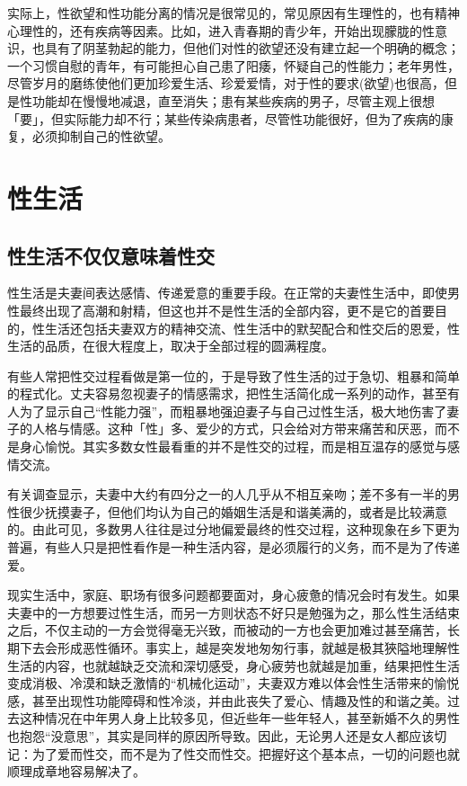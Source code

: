 \documentclass[12pt,UTF8]{ctexbook}
\begin{document}
实际上，性欲望和性功能分离的情况是很常见的，常见原因有生理性的，也有精神心理性的，还有疾病等因素。比如，进入青春期的青少年，开始出现朦胧的性意识，也具有了阴茎勃起的能力，但他们对性的欲望还没有建立起一个明确的概念；一个习惯自慰的青年，有可能担心自己患了阳痿，怀疑自己的性能力；老年男性，尽管岁月的磨练使他们更加珍爱生活、珍爱爱情，对于性的要求(欲望)也很高，但是性功能却在慢慢地减退，直至消失；患有某些疾病的男子，尽管主观上很想「要」，但实际能力却不行；某些传染病患者，尽管性功能很好，但为了疾病的康复，必须抑制自己的性欲望。

\part{性生活}

\chapter{性生活不仅仅意味着性交}

性生活是夫妻间表达感情、传递爱意的重要手段。在正常的夫妻性生活中，即使男性最终出现了高潮和射精，但这也并不是性生活的全部内容，更不是它的首要目的，性生活还包括夫妻双方的精神交流、性生活中的默契配合和性交后的恩爱，性生活的品质，在很大程度上，取决于全部过程的圆满程度。

有些人常把性交过程看做是第一位的，于是导致了性生活的过于急切、粗暴和简单的程式化。丈夫容易忽视妻子的情感需求，把性生活简化成一系列的动作，甚至有人为了显示自己“性能力强”，而粗暴地强迫妻子与自己过性生活，极大地伤害了妻子的人格与情感。这种「性」多、爱少的方式，只会给对方带来痛苦和厌恶，而不是身心愉悦。其实多数女性最看重的并不是性交的过程，而是相互温存的感觉与感情交流。

有关调查显示，夫妻中大约有四分之一的人几乎从不相互亲吻；差不多有一半的男性很少抚摸妻子，但他们均认为自己的婚姻生活是和谐美满的，或者是比较满意的。由此可见，多数男人往往是过分地偏爱最终的性交过程，这种现象在乡下更为普遍，有些人只是把性看作是一种生活内容，是必须履行的义务，而不是为了传递爱。

现实生活中，家庭、职场有很多问题都要面对，身心疲惫的情况会时有发生。如果夫妻中的一方想要过性生活，而另一方则状态不好只是勉强为之，那么性生活结束之后，不仅主动的一方会觉得毫无兴致，而被动的一方也会更加难过甚至痛苦，长期下去会形成恶性循环。事实上，越是突发地匆匆行事，就越是极其狹隘地理解性生活的内容，也就越缺乏交流和深切感受，身心疲劳也就越是加重，结果把性生活变成消极、冷漠和缺乏激情的“机械化运动”，夫妻双方难以体会性生活带来的愉悦感，甚至出现性功能障碍和性冷淡，并由此丧失了爱心、情趣及性的和谐之美。过去这种情况在中年男人身上比较多见，但近些年一些年轻人，甚至新婚不久的男性也抱怨“没意思”，其实是同样的原因所导致。因此，无论男人还是女人都应该切记：为了爱而性交，而不是为了性交而性交。把握好这个基本点，一切的问题也就顺理成章地容易解决了。
\end{document}
